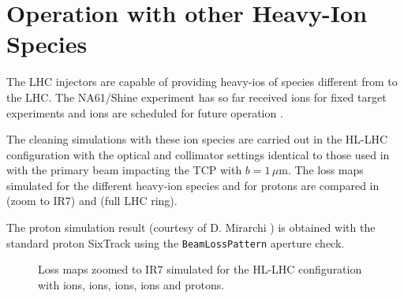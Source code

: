 \newpage

\section{Operation with other Heavy-Ion Species}

The LHC injectors are capable of providing heavy-ios of species different from \lead to the LHC. The NA61/Shine experiment has so far received  ions for fixed target experiments and  ions are scheduled for future operation \cite{EDMS:1570447,CERN-2014-006}. 

The cleaning simulations with these ion species are carried out in the HL-LHC configuration with the optical and collimator settings identical to those used in  with the primary beam impacting the TCP with $b=1\,\mu$m. The loss maps simulated for the different heavy-ion species and for protons are compared in  (zoom to IR7) and  (full LHC ring). 

The proton simulation result (courtesy of D. Mirarchi \cite{IPAC16:WEPMW030}) is obtained with the standard proton SixTrack using the \texttt{BeamLossPattern} aperture check.

\begin{figure}[t]
  \centering
  \caption{Loss maps zoomed to IR7 simulated for the HL-LHC configuration with \lead ions,  ions,  ions,  ions and protons.   }
  \label{pic:16072601}
  \end{figure}

